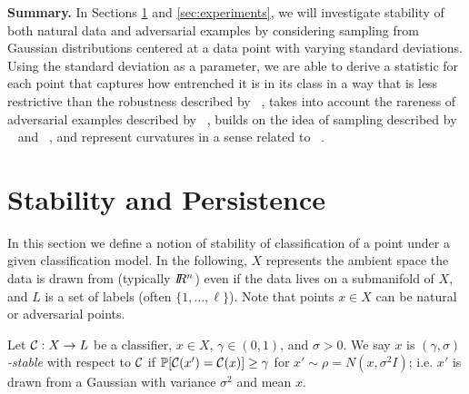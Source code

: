 {\bf Summary.}
 In Sections \ref{sec:stab} and \ref{sec:experiments}, we will investigate stability of both natural data and adversarial examples by considering sampling from Gaussian distributions centered at a data point with varying standard deviations. Using the standard deviation as a parameter, we are able to derive a statistic for each point that captures how entrenched it is in its class in a way that is less restrictive than the robustness described by ~\cite{Khoury2018}, takes into account the rareness of adversarial examples described by ~\cite{yu2019new}, builds on the idea of sampling described by ~\cite{roth19aodds} and ~\cite{hosseini2019odds}, and represent curvatures in a sense related to ~\cite{Fawzi2018empirical}. 


\section{Stability and Persistence} \label{sec:stab}
In this section we define a notion of stability of classification of a point under a given classification model. In the following, $X$ represents the ambient space the data is drawn from (typically $I\!\!R^n$) even if the data lives on a submanifold of $X$, and $L$ is a set of labels (often $\{1,\dots,\ell\}$).  Note that points $x\in X$ can be natural or adversarial points.%

\begin{definition}
Let $\mathcal{C}:X\to L$ be a classifier, $x \in X$, $\gamma\in(0,1)$, and $\sigma>0$. We say $x$ is \emph{$(\gamma,\sigma)$-stable} with respect to $\mathcal{C}$ if $\mathbb{P}[\mathcal{C}(x')=\mathcal{C}(x)] \geq \gamma$ for $x' \sim \rho = N(x, \sigma^2 I)$; i.e. $x'$ is drawn from a Gaussian with variance $\sigma^2$ and mean $x$.
\end{definition}

